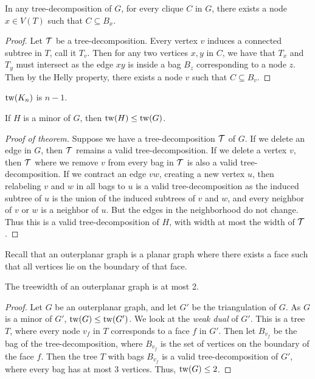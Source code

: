 \begin{theorem}\label{thm:clique}
	In any tree-decomposition of \(G\), for every clique \(C\) in \(G\), there exists a node \(x \in V(T)\) such that \(C \subseteq B_x\).
\end{theorem}

\begin{proof}
	Let \(\mathcal{T}\) be a tree-decomposition. Every vertex \(v\) induces a connected subtree in \(T\), call it \(T_v\). Then for any two vertices \(x, y\) in \(C\), we have that \(T_x\) and \(T_y\) must intersect as the edge \(xy\) is inside a bag \(B_z\) corresponding to a node \(z\). Then by the Helly property, there exists a node \(v\) such that \(C \subseteq B_v\).
\end{proof}

\begin{corollary}\label{cor:complete_tw}
	\(\operatorname{tw}(K_n)\) is \(n-1\).
\end{corollary}

\begin{theorem}\label{thm:tw_minor_closure}
	If \(H\) is a minor of \(G\), then \(\operatorname{tw}(H) \leq \operatorname{tw}(G)\).
\end{theorem}
\begin{proof}[Proof of theorem]
	Suppose we have a tree-decomposition \(\mathcal{T}\) of \(G\). If we delete an edge in \(G\), then \(\mathcal{T}\) remains a valid tree-decomposition. If we delete a vertex \(v\), then \(\mathcal{T}\) where we remove \(v\) from every bag in \(\mathcal{T}\) is also a valid tree-decomposition. If we contract an edge \(vw\), creating a new vertex \(u\), then relabeling \(v\) and \(w\) in all bags to \(u\) is a valid tree-decomposition as the induced subtree of \(u\) is the union of the induced subtrees of \(v\) and \(w\), and every neighbor of \(v\) or \(w\) is a neighbor of \(u\). But the edges in the neighborhood do not change. Thus this is a valid tree-decomposition of \(H\), with width at most the width of \(\mathcal{T}\).
\end{proof}

Recall that an outerplanar graph is a planar graph where there exists a face such that all vertices lie on the boundary of that face.
\begin{lemma}\label{ex:tw_outerplanar}
	The treewidth of an outerplanar graph is at most 2.
\end{lemma}
\begin{proof}
	Let \(G\) be an outerplanar graph, and let \(G'\) be the triangulation of \(G\). As \(G\) is a minor of \(G'\), \(\operatorname{tw}(G) \leq \operatorname{tw}(G')\). We look at the \textit{weak dual} of \(G'\). This is a tree \(T\), where every node \(v_f\) in \(T\) corresponds to a face \(f\) in \(G'\). Then let \(B_{v_f}\) be the bag of the tree-decomposition, where \(B_{v_f}\) is the set of vertices on the boundary of the face \(f\). Then the tree \(T\) with bags \(B_{v_f}\) is a valid tree-decomposition of \(G'\), where every bag has at most 3 vertices. Thus, \(\operatorname{tw}(G) \leq 2\).
\end{proof}

